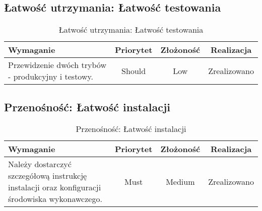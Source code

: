 \subsection{Łatwość utrzymania: Łatwość testowania}

\begin{table}[H]
\centering
\begin{tabular}{ | p{8cm} | c | c | c | }
\hline
\textbf{Wymaganie} & \textbf{Priorytet} & \textbf{Złożoność} & \textbf{Realizacja} \\ \hline
Przewidzenie dwóch trybów - produkcyjny i testowy.
 & Should & Low & Zrealizowano \\ \hline
\end{tabular}
\caption{Łatwość utrzymania: Łatwość testowania}\label{tab:reqs}
\end{table}

\subsection{Przenośność: Łatwość instalacji}

\begin{table}[H]
\centering
\begin{tabular}{ | p{8cm} | c | c | c | }
\hline
\textbf{Wymaganie} & \textbf{Priorytet} & \textbf{Złożoność} & \textbf{Realizacja} \\ \hline
Należy dostarczyć szczegółową instrukcję instalacji oraz konfiguracji środowiska wykonawczego.
 & Must & Medium & Zrealizowano \\ \hline
\end{tabular}
\caption{Przenośność: Łatwość instalacji}\label{tab:reqs}
\end{table}